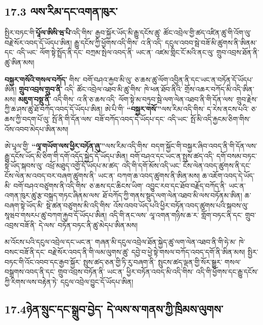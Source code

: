 \documentclass[11pt]{article}
\begin{document}
\subsection*{17.3 ལས་རིམ་དང་འགན་ཁུར་}

སྤྱིར་བཏང་གི་\textbf{པཱོལ་ཨིསི་ཝ་པི་}འདི་གིས་ རྒྱབ་སྐྱོར་ཡོད་མི་རྒྱུ་དངོས་ཚུ་ ཚོང་འབྲེལ་གྱི་ཚད་འཛིན་ཚུ་གི་འོག་ལུ་ བརྗེ་སོར་འབད་དོ་ཡོདཔ་ཨིན། རྒྱུ་དངོས་ཀྱི་ཕྱོགས་འདི་གིས་ འ་ནི་འདི་ དངུལ་འབབ་སྦེ་བཟོ་མི་ཚུགས་ནི་ཨིནམ་དང་ འདི་ཡང་ ལོག་སྟེ་སྤྲོད་ནི་དང་ བཀྲམ་སྤེལ་འབད་ནི་ ཡང་ན་ འཛམ་གླིང་ངོ་མའི་ནང་ལུ་ གྲུབ་འབྲས་ཐོན་ནི་ཚུ་ཨིན་མས།

\textbf{ བསྐྱར་གསོའི་གསལ་བཀོད་} གིས་ བགོ་བཤའ་རྐྱབ་མི་ལུ་ ཅ་ཆས་ཚུ་ལོག་འབྱིན་ནི་དང་ཡང་ན་བཏོན་དོ་ཡོདཔ་ཨིན། \textbf{ གྲུབ་འབྲས་གྲུབ་ནི་} འདི་ ཚོང་འབྲེལ་འཐབ་མི་ཚུ་གིས་ ཁེ་ཕན་ཐོབ་ནིའི་ གྲོས་འཆར་བཀོད་མི་འདི་ཨིན་མས། \textbf{ མཇུག་བསྡུ་ནི་} འདི་གིས་ འ་ནི་ཅ་ཆས་འདི་ ལོག་སྟེ་མ་བཏུབ་སྦེ་ལག་ལེན་འཐབ་ནི་གི་དོན་ལས་ གྲུབ་རྗེས་ཀྱི་ཆ་ཤས་ཚུ་ཐོ་བཀོད་འབད་དོ་ཡོདཔ་ཨིན། ཨེ་པི་གི་ \textbf{``བསྐྱར་གསོ་''}ལས་རིམ་འདི་གིས་ ད་རེས་ནངས་པའི་ ཅ་ཆས་ཀྱི་བདག་པོ་ལུ་ སྤོ་ནི་གི་དོན་ལས་ བཟོ་བཀོད་འབད་དེ་ཡོདཔ་དང་ འདི་ཡང་ སྤོ་མི་འདི་རྐྱངམ་ཅིག་གིས་ འོས་འབབ་མེདཔ་ཨིན་མས།

ཨེ་པཱལ་གྱི་ \textbf{``ལཱ་གཡོག་ལས་ཕྱིར་བཏོན་ཞུ་''}ལས་རིམ་འདི་གིས་ བདག་སྐྱོང་གི་བསྐྱར་ཞིབ་འབད་ནི་གི་དོན་ལས་ རྒྱུ་དངོས་ཡོད་མི་ཅིག་གི་དགོ་འདོད་སྐྱེད་དོ་ཡོདཔ་ཨིན། བགོ་བཤའ་དང་ཡང་ན་སྤུས་ཚད་འདི་ དགོ་བསམ་བཏང་སྟེ་ཡོད་སྐབས་ལུ་ འཕྲོ་མཐུད་འགྱོ་དོ་ཡོདཔ་མ་ཚད་ འདི་གི་དགོ་མོས་འདི་ཡང་ ངོས་ལེན་འབད་ཚུགས་ནི་དང་ ངོས་ལེན་མ་འབད་བར་བཞག་ཚུགས་ནི་ ཡང་ན་ བཀག་ཆ་འབད་ཚུགས་ནི་ཨིན་མས། ཆ་འཇོག་འབད་དེ་ཡོད་མི་ བགོ་བཤའ་བཙུགས་ནི་འདི་གིས་ ཅ་ཆས་དང་ཆིངས་ཡིག་ འབྱུང་རབ་དང་ཐོབ་བརྗོད་བཀོད་ནི་ ཡང་ན་ འགན་ཁུར་ཚུ་རྩ་བསྐྲད་གཏང་ཞིནམ་ལས་ ཐོ་བཀོད་ཀྱི་གནས་སྡུད་ལག་ལེན་འཐབ་མི་ལས་བཏོནམ་ཨིན། ཆ་བཞག་སྟེ་ཡོད་མི་ སྡེ་ཚན་བཙུགས་མི་འདི་གིས་ འོས་འབབ་ཡོད་པའི་ཕྱིར་བཏོན་འབད་ཚུགས་པའི་སྐབས་ལུ་ སཱཝབ་གསརཔ་ཚུ་བཀག་རྐྱབ་དོ་ཡོདཔ་ཨིན། འདི་གི་ནང་ལས་ ལཱ་འགན་གཉིས་ཆ་ར་ གློག་བཏང་ནི་དང་ གྲུབ་འབྲས་བཟོ་ནི་ དེ་ལས་ བཏོན་བཏང་ནི་ཚུ་མེདཔ་ཨིན་མས།

མ་འོངས་པའི་དངུལ་འབྲེལ་དང་ཡང་ན་ གཞན་མི་དངུལ་འབྲེལ་ཐོན་སྐྱེད་ཚུ་ལག་ལེན་འཐབ་ནི་གི་ཧེ་མ་ ཁེ་བསང་བཟོ་ནི་དང་ བརྗེ་སོར་འབད་ནི་གི་ལམ་ལུགས་ཚུ་ དབྱེ་བ་ཕྱེ་སྟེ་གསལ་བཀོད་འབད་དགོ་ནི་ཨིན་མས། སྤྱིར་བཏང་གི་འོང་འབབ་དང་རྒྱབ་སྐྱོར་ སྤུས་ཚད་ཅན་གྱི་ཏི་རུ་བཞག་ནི་ སྤུངས་ཚད་ལྡན་གྱི་སོར་སྒྱུར་ གསལ་བསྒྲགས་འབད་ནི་དང་ གྲུབ་འབྲས་བཏོན་ནི་ ཡང་ན་ ཕྱིར་བཏོན་འབད་མི་འདི་གིས་ འདི་གི་ཕྱོགས་དང་རྒྱུ་དངོས་ཀྱི་རིགས་ལས་བརྟེན་ཏེ་ དངུལ་འབྲེལ་བྱུང་དོ་ཡོདཔ་ཨིན།

\subsection*{17.4ཉེན་སྲུང་དང་སྒྲུབ་བྱེད་ དེ་ལས་ས་གནས་ཀྱི་ཁྲིམས་ལུགས་}
\end{document}
